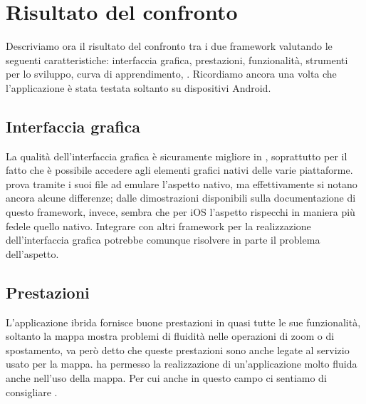 \chapter{Risultato del confronto}
    Descriviamo ora il risultato del confronto tra i due frame\-work valutando
    le seguenti caratteristiche: interfaccia grafica, prestazioni,
    funzionalità, strumenti per lo sviluppo, curva di apprendimento,
    \crossplat{}. Ricordiamo ancora una
    volta che l'applicazione è stata testata soltanto su dispositivi Android.


    \section{Interfaccia grafica}
    La qualità dell'interfaccia grafica è sicuramente migliore in \tisdk{},
    soprattutto per il fatto che è possibile accedere agli elementi
    grafici nativi delle varie piattaforme. \kendomob{} prova tramite i
    suoi file \css{} ad emulare l'aspetto nativo, ma effettivamente si
    notano ancora alcune differenze; dalle dimostrazioni disponibili sulla
    documentazione di questo frame\-work, invece, sembra che per iOS l'aspetto
    rispecchi in maniera più fedele quello nativo. Integrare \pg{} con
    altri frame\-work per la realizzazione dell'interfaccia grafica potrebbe
    comunque risolvere in parte il problema dell'aspetto.


    \section{Prestazioni}
    L'applicazione ibrida fornisce buone prestazioni in quasi tutte
    le sue funzionalità, soltanto la mappa mostra problemi di fluidità
    nelle operazioni di zoom o di spostamento, va però detto che queste
    prestazioni sono anche legate al servizio usato per la mappa.
    \tisdk{} ha permesso la realizzazione di un'applicazione molto fluida
    anche nell'uso della mappa. Per cui anche in questo campo ci sentiamo
    di consigliare \tisdk{}.


